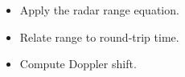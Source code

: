 \begin{objectives}
\begin{itemize}[leftmargin=1.4em,itemsep=2pt]
\item Apply the radar range equation.
\item Relate range to round-trip time.
\item Compute Doppler shift.
\end{itemize}
\end{objectives}
